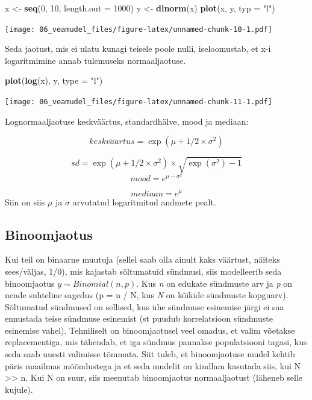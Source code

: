 \documentclass[]{book}
\newenvironment{Shaded}{\begin{snugshade}}{\end{snugshade}}
\newcommand{\KeywordTok}[1]{\textcolor[rgb]{0.13,0.29,0.53}{\textbf{#1}}}
\newcommand{\DataTypeTok}[1]{\textcolor[rgb]{0.13,0.29,0.53}{#1}}
\newcommand{\DecValTok}[1]{\textcolor[rgb]{0.00,0.00,0.81}{#1}}
\newcommand{\StringTok}[1]{\textcolor[rgb]{0.31,0.60,0.02}{#1}}
\newcommand{\NormalTok}[1]{#1}
\begin{document}
\begin{Shaded}
\begin{Highlighting}[]
\NormalTok{x <-}\StringTok{ }\KeywordTok{seq}\NormalTok{(}\DecValTok{0}\NormalTok{, }\DecValTok{10}\NormalTok{, }\DataTypeTok{length.out =} \DecValTok{1000}\NormalTok{)}
\NormalTok{y <-}\StringTok{ }\KeywordTok{dlnorm}\NormalTok{(x)}
\KeywordTok{plot}\NormalTok{(x, y, }\DataTypeTok{typ =} \StringTok{"l"}\NormalTok{)}
\end{Highlighting}
\end{Shaded}

\texttt{[image: 06\_veamudel\_files/figure-latex/unnamed-chunk-10-1.pdf]}

Seda jaotust, mis ei ulatu kunagi teisele poole nulli, iseloomustab, et
x-i logaritmimine annab tulemuseks normaaljaotuse.

\begin{Shaded}
\begin{Highlighting}[]
\KeywordTok{plot}\NormalTok{(}\KeywordTok{log}\NormalTok{(x), y, }\DataTypeTok{type =} \StringTok{"l"}\NormalTok{)}
\end{Highlighting}
\end{Shaded}

\texttt{[image: 06\_veamudel\_files/figure-latex/unnamed-chunk-11-1.pdf]}

Lognormaaljaotuse keskväärtus, standardhälve, mood ja mediaan:

\[keskv\ddot{a}\ddot{a}rtus = \exp(\mu + 1/2 \times \sigma^2)\]

\[sd = \exp(\mu + 1/2 \times \sigma^2) \times \sqrt{\exp(\sigma^2) - 1}\]
\[mood = e^{\mu - \sigma^2}\]

\[mediaan = e^\mu\] Siin on siis \(\mu\) ja \(\sigma\) arvutatud
logaritmitud andmete pealt.

\subsection{Binoomjaotus}\label{binoomjaotus}

Kui teil on binaarne muutuja (sellel saab olla ainult kaks väärtust,
näiteks sees/väljas, 1/0), mis kajastab sõltumatuid sündmusi, siis
modelleerib seda binoomjaotus \(y \sim Binomial(n, p)\). Kus \emph{n} on
edukate sündmuste arv ja \emph{p} on nende suhteline sagedus (p = n / N,
kus \emph{N} on kõikide sündmuste kopguarv). Sõltumatud sündmused on
sellised, kus ühe sündmuse esinemise järgi ei saa ennustada teise
sündmuse esinemist (st puudub korrelatsioon sündmuste esinemise vahel).
Tehniliselt on binoomjaotusel veel omadus, et valim võetakse
replacementiga, mis tähendab, et iga sündmus pannakse populatsiooni
tagasi, kus seda saab uuesti valimisse tõmmata. Siit tuleb, et
binoomjaotuse mudel kehtib päris maailmas mõõndustega ja et seda mudelit
on kindlam kasutada siis, kui N \textgreater{}\textgreater{} n. Kui N on
suur, siis meenutab binoomjaotus normaaljaotust (läheneb selle kujule).
\end{document}
